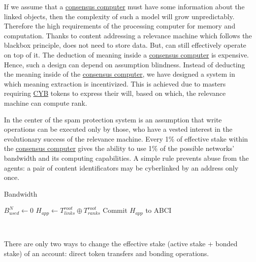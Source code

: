 \documentclass[8pt,oneside]{amsart}
\begin{document}
If we assume that a {\hyperref[consensus-computer]{consensus computer}} must have some information about the linked objects, then the complexity of such a model will grow unpredictably. Therefore the high requirements of the processing computer for memory and computation. Thanks to content addressing a relevance machine which follows the blackbox principle, does not need to store data. But, can still effectively operate on top of it. The deduction of meaning inside a {\hyperref[consensus-computer]{consensus computer}} is expensive. Hence, such a design can depend on assumption blindness. Instead of deducting the meaning inside of the {\hyperref[consensus-computer]{consensus computer}}, we have designed a system in which meaning extraction is incentivized. This is achieved due to masters requiring {\hyperref[cyb]{CYB}} tokens to express their will, based on which, the relevance machine can compute rank.

In the center of the spam protection system is an assumption that write operations can be executed only by those, who have a vested interest in the evolutionary success of the relevance machine. Every 1\% of effective stake within the {\hyperref[consensus-computer]{consensus computer}} gives the ability to use 1\% of the possible networks' bandwidth and its computing capabilities. A simple rule prevents abuse from the agents: a pair of content identificators may be cyberlinked by an address only once.

\begin{algorithm}
\caption{Bandwidth}\label{bandwidth-algo}
$B^{N}_{used} \leftarrow 0$\;
\BlankLine
$H_{app} \leftarrow T^{root}_{links} \oplus T^{root}_{ranks}$\;
Commit $H_{app}$ to ABCI\;
\end{algorithm}\

There are only two ways to change the effective stake (active stake + bonded stake) of an account: direct token transfers and bonding operations.
\end{document}
